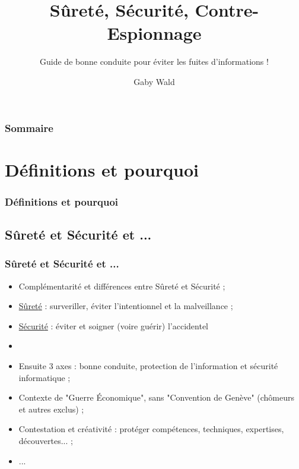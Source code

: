 \documentclass[slidetop,11pt]{beamer}
\title{S{\^u}ret{\'e}, S{\'e}curit{\'e}, Contre-Espionnage}
\subtitle{Guide de bonne conduite pour {\'e}viter les fuites d'informations !}
\author{Gaby Wald}
\institute{\emph{to be defined}}
\begin{document}
\frame[plain]{\titlepage } 
%


\begin{frame}
	\frametitle{Sommaire}
	\small \tableofcontents[hideallsubsections]
\end{frame} 


\section{D{\'e}finitions et pourquoi}
\begin{frame}
	\frametitle{D{\'e}finitions et pourquoi}
	\tableofcontents[sections=1,currentsection,subsectionstyle=show/shaded/hide] %
\end{frame}


\subsection{S{\^u}ret{\'e} et S{\'e}curit{\'e} et ...}
\begin{frame}
	\frametitle{S{\^u}ret{\'e} et S{\'e}curit{\'e} et ...}
	\begin{itemize}
		\item Compl{\'e}mentarit{\'e} et diff{\'e}rences entre S{\^u}ret{\'e} et S{\'e}curit{\'e} ; 
		\item \underline{S{\^u}ret{\'e}} : surveriller, {\'e}viter l'intentionnel et la malveillance ; 
		\item \underline{S{\'e}curit{\'e}} : {\'e}viter et soigner (voire gu{\'e}rir) l'accidentel
		\item[] 
		\item Ensuite 3 axes : bonne conduite, protection de l'information et s{\'e}curit{\'e} informatique ; 
		\item Contexte de "Guerre {\'E}conomique", sans "Convention de Gen{\`e}ve" (ch{\^o}meurs et autres exclus) ; 
		\item Contestation et cr{\'e}ativit{\'e} : prot{\'e}ger comp{\'e}tences, techniques, expertises, d{\'e}couvertes... ; 
		\item ...
	\end{itemize}
\end{frame}
\end{document}
